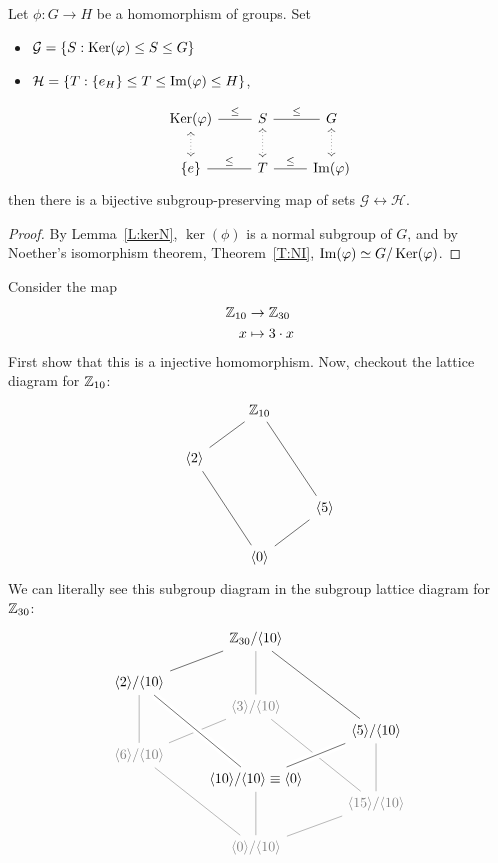 \documentclass{ximera}
\begin{document}
\begin{corollary}
  Let $\phi:G\to H$ be a homomorphism of groups. Set
  \begin{itemize}
  \item $\mathcal{G} = \{S:\mathop{\mathrm{Ker}}\nolimits(\varphi)\leq S\leq G\}$
  \item $\mathcal{H} = \{T:\{e_H\}\leq T\leq \operatorname{Im}(\varphi)\leq H\}$,
  \end{itemize}
  \[
  \begin{tikzcd}
    \ker(\phi) \ar[r,-,"\subgp"] \ar[d,<->,dotted]& S\ar[r,-,"\subgp"] \ar[d,<->,dotted]& G \ar[d,<->,dotted]\\
    \{e\} \ar[r,-,"\subgp"] & T \ar[r,-,"\subgp"] & \im(\phi)
  \end{tikzcd}
  \]
  then there is a bijective subgroup-preserving map of sets
  $\mathcal{G}\leftrightarrow\mathcal{H}$.
  \begin{proof}
    By Lemma~\ref{L:kerN}, $\ker(\phi)$ is a normal subgroup of $G$,
    and by Noether's isomorphism theorem, Theorem~\ref{T:NI},
    $\operatorname{Im}(\varphi)\simeq G/\mathop{\mathrm{Ker}}\nolimits(\varphi)$.
  \end{proof}
\end{corollary}

\begin{example}
  Consider the map
  \begin{align*}
    \mathbb Z_{10} &\to \mathbb Z_{30}\\
    x &\mapsto 3\cdot x
  \end{align*}
  First show that this is a injective homomorphism. Now, checkout the
  lattice diagram for $\mathbb Z_{10}$:
  \[
  \begin{tikzcd}
    & \Z_{10} \ar[ld,-]  \ar[rdd,-] &       \\
    \< 2\> \ar[rdd,-]&       &       \\
    &       & \<5\> \ar[ld,-]\\
    & \<0\> &
  \end{tikzcd}
  \]
  We can literally see this subgroup diagram in the subgroup lattice
  diagram for $\mathbb Z_{30}$:
  \[
  \begin{tikzcd}[row sep=0in]
    & \Z_{30}/\<10\>\ar[ldd,-]  \ar[white!50!black,ddd,-] \ar[rdddd,-] &       \\
    &\phantom{MM} & \\
    \<2\> /\<10\> \ar[white!50!black,ddd,-] &   &  \\
    & \color{white!50!black}\<3\>/\<10\>\ar[white!50!black,ldd,-]\ar[white!50!black,rdddd,-] & \\
    &  &  \<5\> /\<10\>\ar[white!50!black,ddd,-]\\
     \color{white!50!black}\<6\>/\<10\>\ar[white!50!black,rdddd,-]& & \\
    &\<10\>/\<10\> \equiv \<0\> \ar[white!50!black,ddd,-]\ar[ruu,-,white,line width=2mm]\ar[ruu,-]\ar[luuuu,-,white,line width=2mm]\ar[luuuu,-] & \\
    & & \color{white!50!black} \<15\>/\<10\>\ar[white!50!black,ldd,-]\\
    &\phantom{MM} & \\
    &  \color{white!50!black}\<0\>/\<10\> &
  \end{tikzcd}
  \]
\end{example}
\end{document}
